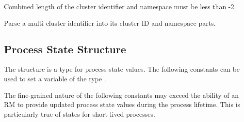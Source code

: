 \begin{arglist}
\end{arglist}

Combined length of the cluster identifier and namespace must be less than -2.


Parse a multi-cluster identifier into its cluster ID and namespace parts.


\begin{arglist}
\end{arglist}


\subsection{Process State Structure}
\label{api:struct:processstate}

The  structure is a  type for process state values. The following constants can be used to set a variable of the type .

\adviceuserstart
The fine-grained nature of the following constants may exceed the ability of an \ac{RM} to provide updated process state values during the process lifetime. This is particularly true of states for short-lived processes.
\adviceuserend

